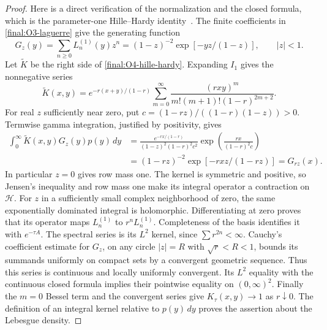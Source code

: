 \begin{proof}
Here is a direct verification of the normalization and the closed
formula, which is the parameter-one Hille--Hardy
identity~\cite[\href{https://dlmf.nist.gov/18.18.E27}{Eq.~18.18.27}]{DLMF}.
The finite coefficients in \eqref{final:O3-laguerre} give the
generating function
\[
 G_z(y)=\sum_{n\geq0}L_n^{(1)}(y)z^n
       =(1-z)^{-2}\exp[-yz/(1-z)],\qquad |z|<1.
\]
Let $\widetilde K$ be the right side of
\eqref{final:O4-hille-hardy}.  Expanding $I_1$ gives the nonnegative
series
\[
 \widetilde K(x,y)=e^{-r(x+y)/(1-r)}
   \sum_{m=0}^\infty
   \frac{(rxy)^m}{m!(m+1)!(1-r)^{2m+2}}.
\]
For real $z$ sufficiently near zero, put
$c=(1-rz)/((1-r)(1-z))>0$.
Termwise gamma integration, justified by positivity, gives
\begin{align*}
 \int_0^\infty\widetilde K(x,y)G_z(y)p(y)\,dy
 &=\frac{e^{-rx/(1-r)}}{(1-z)^2(1-r)^2c^2}
       \exp\!\left(\frac{rx}{(1-r)^2c}\right)\\
 &=(1-rz)^{-2}\exp[-rxz/(1-rz)]=G_{rz}(x).
\end{align*}
In particular $z=0$ gives row mass one.  The kernel is symmetric and
positive, so Jensen's inequality and row mass one make its integral
operator a contraction on $\mathcal H$.  For $z$ in a sufficiently
small complex neighborhood of zero, the same exponentially dominated
integral is holomorphic.  Differentiating at zero proves that its
operator maps $L_n^{(1)}$ to $r^nL_n^{(1)}$.  Completeness of the
basis identifies it with $e^{-\tau A}$.
The spectral series is its $L^2$ kernel, since
$\sum r^{2n}<\infty$.  Cauchy's coefficient estimate for $G_z$,
on any circle $|z|=R$ with $\sqrt r<R<1$, bounds its summands
uniformly on compact sets by a convergent geometric sequence.
Thus this series is continuous and locally uniformly convergent.
Its $L^2$ equality with the continuous closed formula implies their
pointwise equality on $(0,\infty)^2$.  Finally the $m=0$ Bessel term
and the convergent series give $K_\tau(x,y)\to1$ as $r\downarrow0$.
The definition of an integral kernel relative to $p(y)\,dy$ proves
the assertion about the Lebesgue density.
\end{proof}

